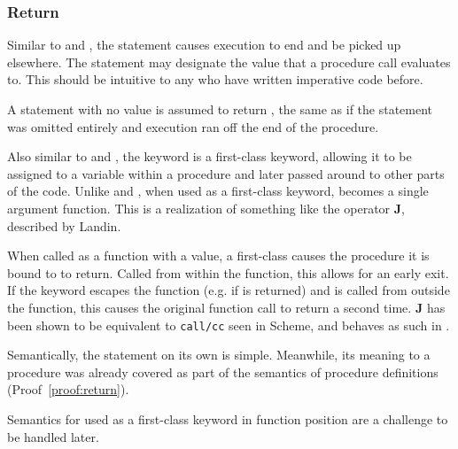 \subsubsection{Return}

Similar to  and , the  statement causes execution
to end and be picked up elsewhere. The  statement may designate the value
that a procedure call evaluates to. This should be intuitive to any who have written
imperative code before.

A  statement with no value is assumed to return , the same as if
the  statement was omitted entirely and execution ran off the end of the
procedure.

Also similar to  and , the  keyword is a first-class
keyword, allowing it to be assigned to a variable within a procedure and later passed
around to other parts of the code. Unlike  and , when used as
a first-class keyword,  becomes a single argument function. This is a
realization of something like the operator \textbf{J}, described by Landin\cite{j}.

When called as a function with a value, a first-class  causes the procedure
it is bound to to return. Called from within the function, this allows for an early
exit. If the  keyword escapes the function (e.g. if  is
returned) and is called from outside the function, this causes the original function
call to return a second time. \textbf{J} has been shown to be equivalent to
\texttt{call/cc} seen in Scheme\cite{defint}, and behaves as such in \Trilogy{}.

\begin{bnf*}
\end{bnf*}

Semantically, the  statement on its own is simple. Meanwhile, its meaning
to a procedure was already covered as part of the semantics of procedure definitions
(Proof~\ref{proof:return}).

\begin{prooftree}
\end{prooftree}

Semantics for  used as a first-class keyword in function position are
a challenge to be handled later.
